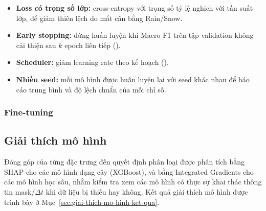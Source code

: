 \begin{itemize}
  \item \textbf{Loss có trọng số lớp:} cross-entropy với trọng số tỷ lệ nghịch với tần
        suất lớp, để giảm thiên lệch do mất cân bằng Rain/Snow.
  \item \textbf{Early stopping:} dừng huấn luyện khi Macro F1 trên tập validation không
        cải thiện sau $k$ epoch liên tiếp ().
  \item \textbf{Scheduler:} giảm learning rate theo kế hoạch ().
  \item \textbf{Nhiều seed:} mỗi mô hình được huấn luyện lại với  seed
        khác nhau để báo cáo trung bình và độ lệch chuẩn của mỗi chỉ số.
\end{itemize}

\subsubsection{Fine-tuning}
\label{sec:fine-tuning}


\subsection{Giải thích mô hình}
\label{sec:giai-thich-mo-hinh}

Đóng góp của từng đặc trưng đến quyết định phân loại được phân tích bằng SHAP
\cite{lundberg2017shap} cho các mô hình dạng cây (XGBoost), và bằng Integrated Gradients
\cite{sundararajan2017integratedgradients} cho các mô hình học sâu, nhằm kiểm tra xem các
mô hình có thực sự khai thác thông tin mask/$\Delta t$ khi dữ liệu bị thiếu hay không.
Kết quả giải thích mô hình được trình bày ở Mục~\ref{sec:giai-thich-mo-hinh-ket-qua}.
